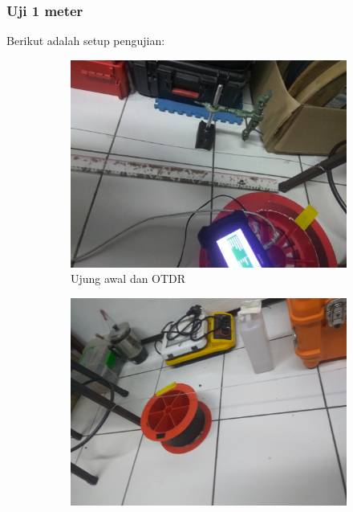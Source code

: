 \documentclass[12pt]{article}
\begin{document}
	\subsubsection{Uji 1 meter} 
	
	Berikut adalah setup pengujian:
	
	\begin{figure}[h!]
		\centering
		\captionsetup{justification=centering}
		\begin{subfigure}[b]{0.2\textwidth}
			\includegraphics[width=\textwidth]{images/Bab_4/Bab_4_5a}	
			\caption{{\small Ujung awal dan OTDR}}		
		\end{subfigure}
		\begin{subfigure}[b]{0.2\textwidth}
			\includegraphics[width=\linewidth]{images/Bab_4/Bab_4_5b}

\end{subfigure}
\end{figure}
\end{document}
